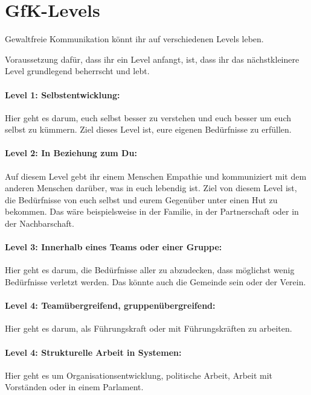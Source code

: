 \section{GfK-Levels}
\label{gfk-levels}

Gewaltfreie Kommunikation könnt ihr auf verschiedenen Levels leben.

Voraussetzung dafür, dass ihr ein Level anfangt, ist, dass ihr das nächstkleinere Level grundlegend beherrscht und lebt.

\paragraph{Level 1: Selbstentwicklung:} Hier geht es darum, euch selbst besser zu verstehen und euch besser um euch selbst zu kümmern. Ziel dieses Level ist, eure eigenen Bedürfnisse zu erfüllen.

\paragraph{Level 2: In Beziehung zum Du:} Auf diesem Level gebt ihr einem Menschen Empathie und kommuniziert mit dem anderen Menschen darüber, was in euch lebendig ist. Ziel von diesem Level ist, die Bedürfnisse von euch selbst und eurem Gegenüber unter einen Hut zu bekommen. Das wäre beispielsweise in der Familie, in der Partnerschaft oder in der Nachbarschaft.

\paragraph{Level 3: Innerhalb eines Teams oder einer Gruppe:} Hier geht es darum, die Bedürfnisse aller zu abzudecken, dass möglichst wenig Bedürfnisse verletzt werden. Das könnte auch die Gemeinde sein oder der Verein.

\paragraph{Level 4: Teamübergreifend, gruppenübergreifend:} Hier geht es darum, als Führungskraft oder mit Führungskräften zu arbeiten.

\paragraph{Level 4: Strukturelle Arbeit in Systemen:} Hier geht es um Organisationsentwicklung, politische Arbeit, Arbeit mit Vorständen oder in einem Parlament.
